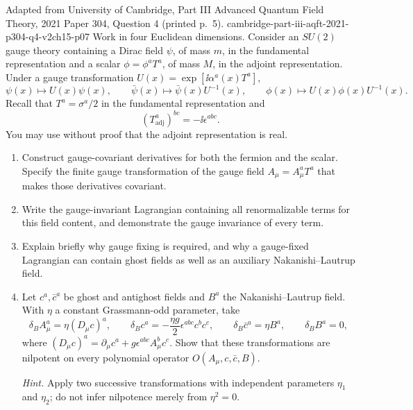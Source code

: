 \begin{enumerate}
  {Adapted from University of Cambridge, Part III Advanced Quantum Field
  Theory, 2021 Paper 304, Question 4 (printed p.~5).}
  {cambridge-part-iii-aqft-2021-p304-q4-v2ch15-p07}
  Work in four Euclidean dimensions.  Consider an \(SU(2)\) gauge theory
  containing a Dirac field \(\psi\), of mass \(m\), in the fundamental
  representation and a scalar
  \(\phi=\phi^aT^a\), of mass \(M\), in the adjoint representation.  Under
  a gauge transformation \(U(x)=\exp[\ii\alpha^a(x)T^a]\),
  \[
    \psi(x)\longmapsto U(x)\psi(x),\qquad
    \bar\psi(x)\longmapsto\bar\psi(x)U^{-1}(x),\qquad
    \phi(x)\longmapsto U(x)\phi(x)U^{-1}(x).
  \]
  Recall that \(T^a=\sigma^a/2\) in the fundamental representation and
  \[
    (T^a_{\mathrm{adj}})^{bc}=-\ii\epsilon^{abc}.
  \]
  You may use without proof that the adjoint representation is real.
  \begin{enumerate}
    \item[(a)] Construct gauge-covariant derivatives for both the fermion
      and the scalar.  Specify the finite gauge transformation of the gauge
      field \(A_\mu=A_\mu^aT^a\) that makes those derivatives covariant.
    \item[(b)] Write the gauge-invariant Lagrangian containing all
      renormalizable terms for this field content, and demonstrate the gauge
      invariance of every term.
    \item[(c)] Explain briefly why gauge fixing is required, and why a
      gauge-fixed Lagrangian can contain ghost fields as well as an auxiliary
      Nakanishi--Lautrup field.
    \item[(d)] Let \(c^a,\bar c^a\) be ghost and antighost fields and
      \(B^a\) the Nakanishi--Lautrup field.  With \(\eta\) a constant
      Grassmann-odd parameter, take
      \[
        \delta_B A_\mu^a=\eta(D_\mu c)^a,
        \qquad
        \delta_B c^a=-\frac{\eta g}{2}\epsilon^{abc}c^bc^c,
        \qquad
        \delta_B\bar c^a=\eta B^a,
        \qquad
        \delta_BB^a=0,
      \]
      where
      \((D_\mu c)^a=\partial_\mu c^a
      +g\epsilon^{abc}A_\mu^bc^c\).  Show that these transformations are
      nilpotent on every polynomial operator
      \(O(A_\mu,c,\bar c,B)\).

      \emph{Hint.} Apply two successive transformations with independent
      parameters \(\eta_1\) and \(\eta_2\); do not infer nilpotence merely
      from \(\eta^2=0\).
  \end{enumerate}


\end{enumerate}
